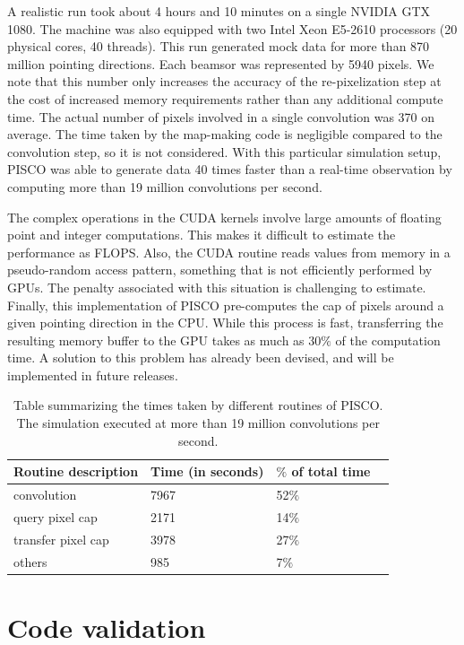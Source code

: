 \documentclass[a4paper,fleqn]{cas-dc}\sloppy
\begin{document}
	A realistic run took about 4 hours and 10 minutes on a single NVIDIA GTX 1080. The machine was also equipped with two Intel Xeon E5-2610 processors (20 physical cores, 40 threads). This run generated mock data for more than 870 million pointing directions. Each beamsor was represented by 5940 pixels. We note that this number only increases the accuracy of the re-pixelization step at the cost of increased memory requirements rather than any additional compute time. The actual number of pixels involved in a single convolution was 370 on average. The time taken by the map-making code is negligible compared to the convolution step, so it is not considered. With this particular simulation setup, PISCO was able to generate data 40 times faster than a real-time observation by computing more than 19 million convolutions per second. 
	
	The complex operations in the CUDA kernels involve large amounts of floating point and integer computations. This makes it difficult to estimate the performance as FLOPS. Also, the CUDA routine reads values from memory in a pseudo-random access pattern, something that is not efficiently performed by GPUs. The penalty associated with this situation is challenging to estimate. Finally, this implementation of PISCO pre-computes the cap of pixels around a given pointing direction in the CPU. While this process is fast, transferring the resulting memory buffer to the GPU takes as much as $30\%$ of the computation time. A solution to this problem has already been devised, and will be implemented in future releases.
	
	\begin{table}[width=.9\linewidth,cols=3,pos=h]
		\caption{Table summarizing the times taken by different routines of PISCO. The simulation executed at more than 19 million convolutions per second.}\label{tbl1}
		\begin{tabular*}{\tblwidth}{@{} LLLL@{} }
			\toprule
			Routine description & Time (in seconds) & $\%$ of total time \\
			\midrule
			convolution & 7967 & 52$\%$ & \\
			query pixel cap & 2171 & 14$\%$ & \\
			transfer pixel cap & 3978 & 27$\%$ & \\
			others & 985 & 7$\%$ & \\
			\bottomrule
		\end{tabular*}
	\end{table}
	
	\section{Code validation}
	\label{sec::validation}
	
\end{document}

